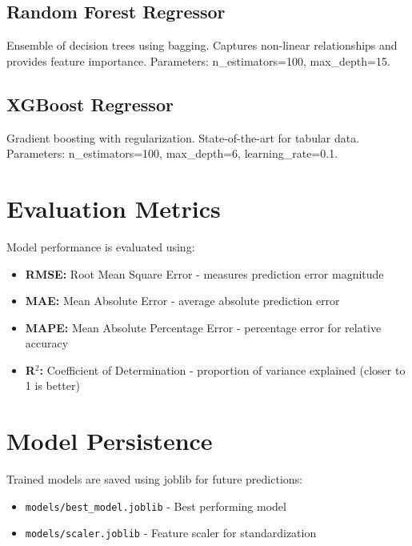     \subsection{Random Forest Regressor}
    Ensemble of decision trees using bagging. Captures non-linear relationships and provides feature importance. Parameters: n\_estimators=100, max\_depth=15.

    \subsection{XGBoost Regressor}
    Gradient boosting with regularization. State-of-the-art for tabular data. Parameters: n\_estimators=100, max\_depth=6, learning\_rate=0.1.

    \section{Evaluation Metrics}
    Model performance is evaluated using:
    \begin{itemize}
        \item \textbf{RMSE:} Root Mean Square Error - measures prediction error magnitude
        \item \textbf{MAE:} Mean Absolute Error - average absolute prediction error
        \item \textbf{MAPE:} Mean Absolute Percentage Error - percentage error for relative accuracy
        \item \textbf{R$^2$:} Coefficient of Determination - proportion of variance explained (closer to 1 is better)
    \end{itemize}

    \section{Model Persistence}
    Trained models are saved using joblib for future predictions:
    \begin{itemize}
        \item \texttt{models/best\_model.joblib} - Best performing model
        \item \texttt{models/scaler.joblib} - Feature scaler for standardization
    \end{itemize}
